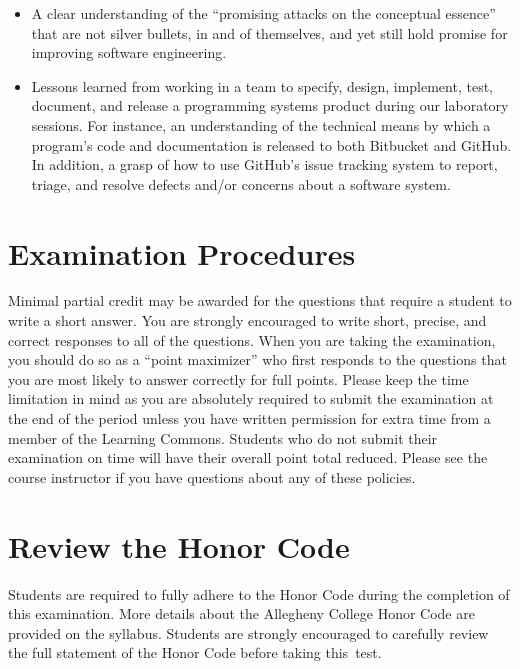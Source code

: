 \begin{itemize}
  \item A clear understanding of the ``promising attacks on the conceptual essence'' that are not silver bullets, in and
    of themselves, and yet still hold promise for improving software engineering.

  \item Lessons learned from working in a team to specify, design, implement, test, document, and release a programming
    systems product during our laboratory sessions. For instance, an understanding of the technical means by which a
    program's code and documentation is released to both Bitbucket and GitHub. In addition, a grasp of how to use
    GitHub's issue tracking system to report, triage, and resolve defects and/or concerns about a software system.

\end{itemize}

\vspace*{-.1in}
\section*{Examination Procedures}
\vspace*{-.06in}

\noindent Minimal partial credit may be awarded for the questions that require a student to write a short answer. You
are strongly encouraged to write short, precise, and correct responses to all of the questions. When you are taking the
examination, you should do so as a ``point maximizer'' who first responds to the questions that you are most likely to
answer correctly for full points. Please keep the time limitation in mind as you are absolutely required to submit the
examination at the end of the period unless you have written permission for extra time from a member of the
Learning Commons. Students who do not submit their examination on time will have their overall point total reduced.
Please see the course instructor if you have questions about any of these policies.

\vspace*{-.1in}
\section*{Review the Honor Code}
\vspace*{-.06in}

\noindent Students are required to fully adhere to the Honor Code during the completion of this examination. More
details about the Allegheny College Honor Code are provided on the syllabus. Students are strongly encouraged to
carefully review the full statement of the Honor Code before taking \mbox{this test}.

